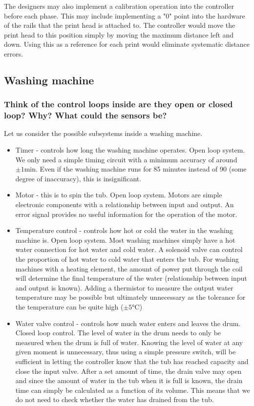 \documentclass[class=report, crop=false, 12pt,a4paper]{standalone}
\begin{document}
The designers may also implement a calibration operation into the controller before each phase. This may include implementing a "0" point into the hardware of the rails that the print head is attached to. The controller would move the print head to this position simply by moving the maximum distance left and down. Using this as a reference for each print would eliminate systematic distance errors.
\subsection*{Washing machine}
\subsubsection*{Think of the control loops inside are they open or closed loop? Why? What could the sensors be?}
Let us consider the possible subsystems inside a washing machine.
\begin{itemize}
  \item Timer - controls how long the washing machine operates. Open loop system. We only need a simple timing circuit with a minimum accuracy of around $\pm 1 \si{\minute}$. Even if the washing machine runs for 85 minutes instead of 90 (some degree of inaccuracy), this is insignificant. 
  \item Motor - this is to spin the tub. Open loop system. Motors are simple electronic components with a relationship between input and output. An error signal provides no useful information for the operation of the motor. 
  \item Temperature control - controls how hot or cold the water in the washing machine is. Open loop system. Most washing machines simply have a hot water connection for hot water and cold water. A solenoid valve can control the proportion of hot water to cold water that enters the tub. For washing machines with a heating element, the amount of power put through the coil will determine the final temperature of the water (relationship between input and output is known). Adding a thermistor to measure the output water temperature may be possible but ultimately unnecessary as the tolerance for the temperature can be quite high ($\pm 5 \si{\celsius}$)
  \item Water valve control - controls how much water enters and leaves the drum. Closed loop control. The level of water in the drum needs to only be measured when the drum is full of water. Knowing the level of water at any given moment is unnecessary, thus using a simple pressure switch, will be sufficient in letting the controller know that the tub has reached capacity and close the input valve. After a set amount of time, the drain valve may open and since the amount of water in the tub when it is full is known, the drain time can simply be calculated as a function of its volume. This means that we do not need to check whether the water has drained from the tub.
\end{itemize}
\end{document}
